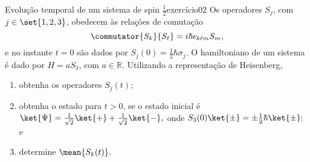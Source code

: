 \begin{exercício}{Evolução temporal de um sistema de spin \(\frac12\)}{exercício02}
    Os operadores \(S_j\), com \(j \in \set{1,2,3}\), obedecem às relações de comutação 
    \begin{equation*}
        \commutator{S_k}{S_\ell} = i \hbar \epsilon_{k\ell m} S_m,
    \end{equation*}
    e no instante \(t = 0\) são dados por \(S_j(0) = \frac12 \hbar \sigma_j\). O hamiltoniano de um sistema é dado por \(H = a S_3\), com \(a \in \mathbb{R}\). Utilizando a representação de Heisenberg,
    \begin{enumerate}[label=(\alph*)]
        \item obtenha os operadores \(S_j(t)\);
        \item obtenha o estado para \(t > 0\), se o estado inicial é \(\ket{\Psi} = \frac1{\sqrt{2}} \ket{+} + \frac1{\sqrt{2}} \ket{-},\) onde \(S_3(0) \ket{\pm} = \pm \frac12 \hbar \ket{\pm};\) e 
        \item determine \(\mean{S_k(t)}.\)
    \end{enumerate}
\end{exercício}
